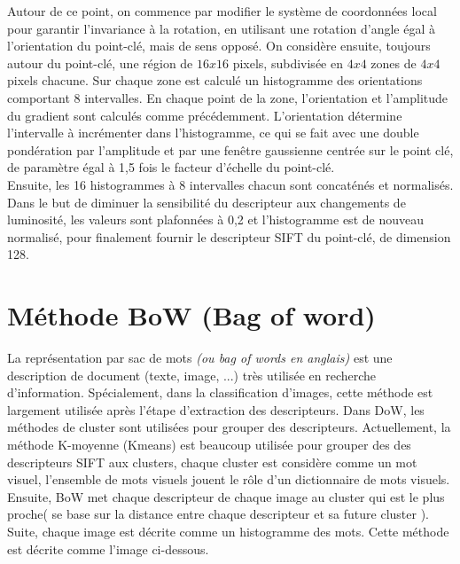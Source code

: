 Autour de ce point, on commence par modifier le système de coordonnées local pour garantir l'invariance à la rotation, en utilisant une rotation d'angle égal à l'orientation du point-clé, mais de sens opposé. On considère ensuite, toujours autour du point-clé, une région de $16x16$ pixels, subdivisée en $4x4$ zones de $4x4$ pixels chacune. Sur chaque zone est calculé un histogramme des orientations comportant 8 intervalles. En chaque point de la zone, l'orientation et l'amplitude du gradient sont calculés comme précédemment. L'orientation détermine l'intervalle à incrémenter dans l'histogramme, ce qui se fait avec une double pondération par l'amplitude et par une fenêtre gaussienne centrée sur le point clé, de paramètre égal à 1,5 fois le facteur d'échelle du point-clé\cite{low04}.\\

Ensuite, les 16 histogrammes à 8 intervalles chacun sont concaténés et normalisés. Dans le but de diminuer la sensibilité du descripteur aux changements de luminosité, les valeurs sont plafonnées à 0,2 et l'histogramme est de nouveau normalisé, pour finalement fournir le descripteur SIFT du point-clé, de dimension 128.

\section{Méthode BoW (Bag of word)}
La représentation par sac de mots \textit{(ou bag of words en anglais)} est une description de document (texte, image, ...) très utilisée en recherche d'information. Spécialement, dans la classification d'images, cette méthode est largement utilisée après l'étape d'extraction des descripteurs. Dans DoW, les méthodes de cluster sont utilisées pour grouper des  descripteurs. Actuellement, la méthode K-moyenne (Kmeans)\cite{jm67} est beaucoup utilisée pour grouper des des descripteurs SIFT aux clusters, chaque cluster est considère comme un mot visuel, l'ensemble de mots visuels jouent le rôle d'un dictionnaire de mots visuels. Ensuite, BoW met chaque descripteur de chaque image au cluster qui est le plus proche( se base sur la distance entre chaque descripteur et sa future cluster ). Suite, chaque image est décrite comme un histogramme des mots. Cette méthode est décrite comme l'image ci-dessous.

